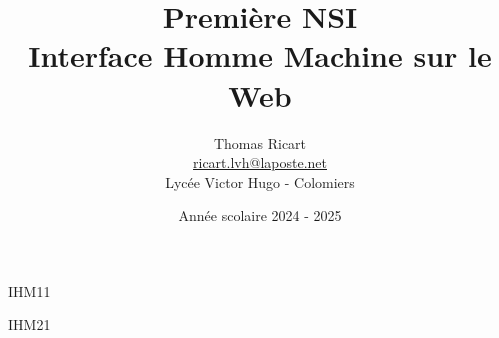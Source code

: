 \documentclass[a4paper,11pt]{book}
\begin{document}
\thispagestyle{empty}
\title{{\Huge Première NSI}\\ Interface Homme Machine sur le Web}
\author{Thomas Ricart \\ \url{ricart.lvh@laposte.net} \\ Lycée Victor Hugo - Colomiers}
\date{Année scolaire 2024 - 2025}
\maketitle

\pagestyle{otherpage}
\fancyfoot[L]{}

\graphicspath{{IHM1-HTML CSS/Images/}}
{IHM11}

\graphicspath{{IHM2-Interface Client - Serveur/Images}}
{IHM21}
\end{document}
